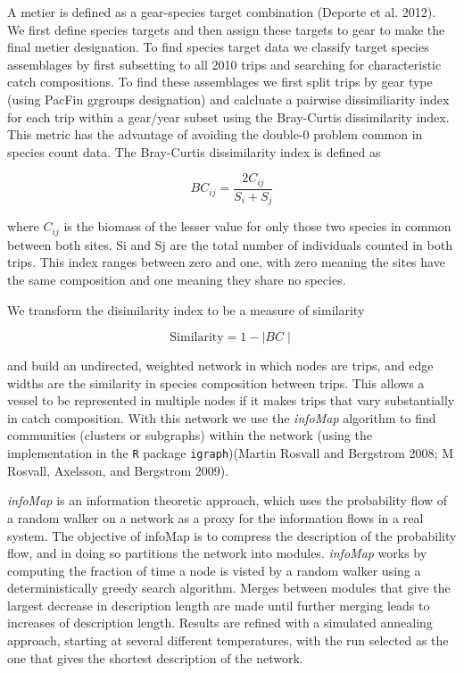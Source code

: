 \documentclass[]{article}
\begin{document}
A metier is defined as a gear-species target combination (Deporte et al.
2012). We first define species targets and then assign these targets to
gear to make the final metier designation. To find species target data
we classify target species assemblages by first subsetting to all 2010
trips and searching for characteristic catch compositions. To find these
assemblages we first split trips by gear type (using PacFin grgroups
designation) and calcluate a pairwise dissimiliarity index for each trip
within a gear/year subset using the Bray-Curtis dissimilarity index.
This metric has the advantage of avoiding the double-0 problem common in
species count data. The Bray-Curtis dissimilarity index is defined as

\[BC_{ij} = \frac{2C_{ij}}{S_i + S_j}\]

where \(C_{ij}\) is the biomass of the lesser value for only those two
species in common between both sites. Si and Sj are the total number of
individuals counted in both trips. This index ranges between zero and
one, with zero meaning the sites have the same composition and one
meaning they share no species.

We transform the disimilarity index to be a measure of similarity

\[\text{Similarity} = 1-\mid BC \mid\]

and build an undirected, weighted network in which nodes are trips, and
edge widths are the similarity in species composition between trips.
This allows a vessel to be represented in multiple nodes if it makes
trips that vary substantially in catch composition. With this network we
use the \emph{infoMap} algorithm to find communities (clusters or
subgraphs) within the network (using the implementation in the
\texttt{R} package \texttt{igraph})(Martin Rosvall and Bergstrom 2008; M
Rosvall, Axelsson, and Bergstrom 2009).

\emph{infoMap} is an information theoretic approach, which uses the
probability flow of a random walker on a network as a proxy for the
information flows in a real system. The objective of infoMap is to
compress the description of the probability flow, and in doing so
partitions the network into modules. \emph{infoMap} works by computing
the fraction of time a node is visted by a random walker using a
deterministically greedy search algorithm. Merges between modules that
give the largest decrease in description length are made until further
merging leads to increases of description length. Results are refined
with a simulated annealing approach, starting at several different
temperatures, with the run selected as the one that gives the shortest
description of the network.
\end{document}
